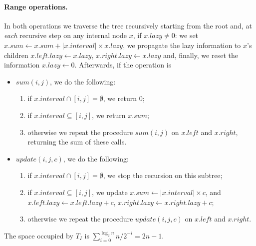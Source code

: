 \paragraph{Range operations.} In both operations we traverse the tree recursively starting from the root and, at \emph{each} recursive step on any internal node $x$, if $x.lazy \neq 0$: we set $x.sum \gets x.sum + |x.interval| \times x.lazy$, we propagate the lazy information to $x$'s children $x.left.lazy \gets x.lazy$, $x.right.lazy \gets x.lazy$ and, finally, we reset the information $x.lazy \gets 0$. Afterwards, if the operation is 
\begin{itemize}
  \item $sum(i,j)$, we do the following:
  \begin{enumerate}
    \item if $x.interval \cap [i,j] = \emptyset$, we return 0;
    \item if $x.interval \subseteq [i,j]$, we return $x.sum$;
    \item otherwise we repeat the procedure $sum(i,j)$ on $x.left$ and $x.right$, returning the sum of these calls.
  \end{enumerate}

  \item $update(i,j,c)$, we do the following:
  \begin{enumerate}
    \item if $x.interval \cap [i,j] = \emptyset$, we stop the recursion on this subtree;
    \item if $x.interval \subseteq [i,j]$, we update $x.sum \gets |x.interval| \times c$, and $x.left.lazy \gets x.left.lazy + c$, $x.right.lazy \gets x.right.lazy + c$;
    \item otherwise we repeat the procedure $update(i,j,c)$ on $x.left$ and $x.right$.
  \end{enumerate} 
\end{itemize}
The space occupied by $T_I$ is $\sum_{i=0}^{\log_2 n} n/2^{-i}=2n-1$.